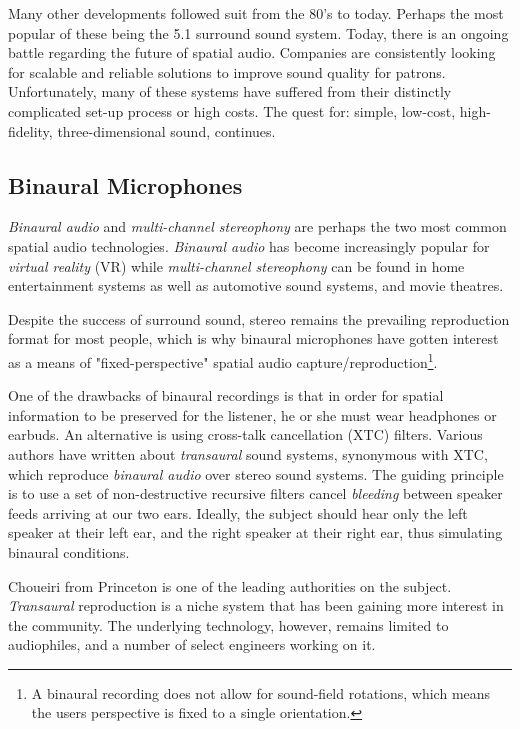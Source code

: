 Many other developments followed suit from the 80's to today. Perhaps the most popular of these being the 5.1 surround sound system. Today, there is an ongoing battle regarding the future of spatial audio. Companies are consistently looking for scalable and reliable solutions to improve sound quality for patrons. Unfortunately, many of these systems have suffered from their distinctly complicated set-up process or high costs. The quest for: simple, low-cost, high-fidelity, three-dimensional sound, continues. 



\subsection{Binaural Microphones}

\textit{Binaural audio} and \textit{multi-channel stereophony} are perhaps the two most common spatial audio technologies. \textit{Binaural audio} has become increasingly popular for \textit{virtual reality} (VR) while \textit{multi-channel stereophony} can be found in home entertainment systems as well as automotive sound systems, and movie theatres. 

Despite the success of surround sound, stereo remains the prevailing reproduction format for most people, which is why binaural microphones have gotten interest as a means of "fixed-perspective" spatial audio capture/reproduction\footnote{A binaural recording does not allow for sound-field rotations, which means the users perspective is fixed to a single orientation.}. 

One of the drawbacks of binaural recordings is that in order for spatial information to be preserved for the listener, he or she must wear headphones or earbuds. An alternative is using cross-talk cancellation (XTC) filters. Various authors have written about \textit{transaural} sound systems, synonymous with XTC, which reproduce \textit{binaural audio} over stereo sound systems. The guiding principle is to use a set of non-destructive recursive filters cancel \textit{bleeding} between speaker feeds arriving at our two ears. Ideally, the subject should hear only the left speaker at their left ear, and the right speaker at their right ear, thus simulating binaural conditions. 

Choueiri \cite{choueiri2008optimal} from Princeton is one of the leading authorities on the subject. \textit{Transaural} reproduction is a niche system that has been gaining more interest in the community. The underlying technology, however, remains limited to audiophiles, and a number of select engineers working on it.

